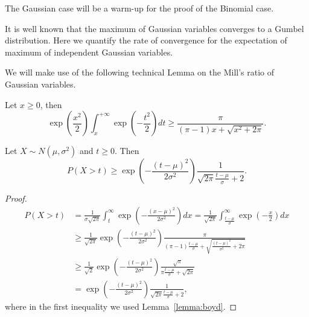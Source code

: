 \documentclass{article} %
\begin{document}
The Gaussian case will be a warm-up for the proof of the Binomial case.

It is well known that the maximum of Gaussian variables converges to a Gumbel distribution. Here we quantify the rate of convergence for the expectation of maximum of independent Gaussian variables.

We will make use of the following technical Lemma on the Mill's ratio of Gaussian variables.
\begin{lemma}
\label{lemma:boyd}
Let $x\geq0$, then
\[
\exp\left(\frac{x^2}{2}\right) \int_{x}^{+\infty} \exp\left(-\frac{t^2}{2}\right) dt
\geq \frac{\pi}{(\pi-1)x+\sqrt{x^2+2 \pi}}.
\]
\end{lemma}
%
\begin{cor}
Let $X \sim N(\mu, \sigma^2)$ and $t \geq 0$. Then
\[
P(X>t) \geq \exp\left(-\frac{(t-\mu)^2}{2 \sigma^2}\right) \frac{1}{\sqrt{2\pi}\frac{t-\mu}{\sigma}+2}.
\]
\end{cor}
%
\begin{proof}
\begin{align*}
P(X>t)
&= \frac{1}{\sigma \sqrt{2 \pi}} \int_t^{\infty} \exp(-\frac{(x-\mu)^2}{2 \sigma^2}) d x 
= \frac{1}{\sqrt{2 \pi}} \int_\frac{t-\mu}{\sigma}^{\infty} \exp(-\frac{x}{2}) d x \\
&\geq \frac{1}{\sqrt{2 \pi}} \exp\left(-\frac{(t-\mu)^2}{2 \sigma^2}\right) \frac{\pi}{(\pi-1)\frac{t-\mu}{\sigma}+\sqrt{\frac{(t-\mu)^2}{\sigma^2}+2 \pi}} \\
&\geq \frac{1}{\sqrt{2}} \exp\left(-\frac{(t-\mu)^2}{2 \sigma^2}\right) \frac{\sqrt{\pi}}{\pi\frac{t-\mu}{\sigma}+\sqrt{2 \pi}} \\
&= \exp\left(-\frac{(t-\mu)^2}{2 \sigma^2}\right) \frac{1}{\sqrt{2\pi}\frac{t-\mu}{\sigma}+2},
\end{align*}
where in the first inequality we used Lemma~\ref{lemma:boyd}.
\end{proof}
\end{document}
